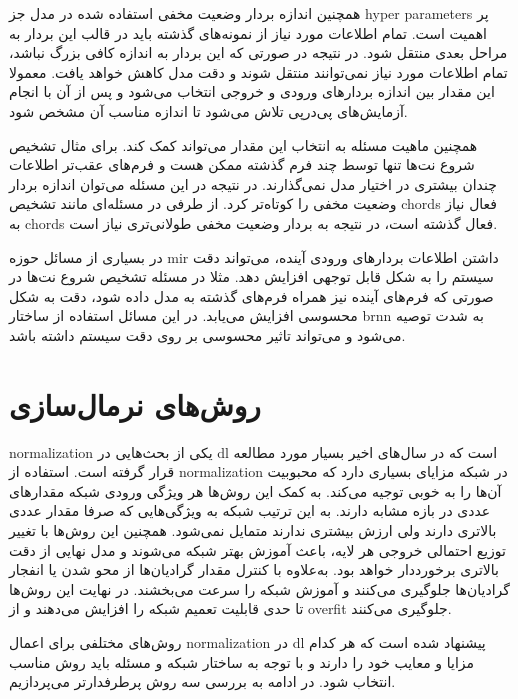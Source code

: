 همچنین اندازه بردار وضعیت مخفی استفاده شده در مدل جز \glspl{hyper parameter} پر
اهمیت است. تمام اطلاعات مورد نیاز از نمونه‌های گذشته باید در قالب این بردار
به مراحل بعدی منتقل شود. در نتیجه در صورتی که این بردار به اندازه کافی بزرگ
نباشد، تمام اطلاعات مورد نیاز نمی‌توانند منتقل شوند و دقت مدل کاهش خواهد یافت.
معمولا این مقدار بین اندازه بردارهای ورودی و خروجی انتخاب می‌شود و پس از آن با
انجام آزمایش‌های پی‌در‌پی تلاش می‌شود تا اندازه مناسب آن مشخص شود.

همچنین ماهیت مسئله به انتخاب این مقدار می‌تواند کمک کند. برای مثال تشخیص شروع
نت‌ها تنها توسط چند فرم گذشته ممکن هست و فرم‌های عقب‌تر اطلاعات چندان بیشتری در
اختیار مدل نمی‌گذارند. در نتیجه در این مسئله می‌توان اندازه بردار وضعیت مخفی را
کوتاه‌تر کرد. از طرفی در مسئله‌ای مانند تشخیص \glspl{chord} فعال نیاز به
\glspl{chord} فعال گذشته است، در نتیجه به بردار وضعیت مخفی طولانی‌تری نیاز است.

در بسیاری از مسائل حوزه \gls{mir} داشتن اطلاعات بردارهای ورودی آینده، می‌تواند
دقت سیستم را به شکل قابل توجهی افزایش دهد. مثلا در مسئله تشخیص شروع نت‌ها در
صورتی که فرم‌های آینده نیز همراه فرم‌های گذشته به مدل داده شود، دقت به شکل
محسوسی افزایش می‌یابد. در این مسائل استفاده از ساختار \gls{brnn} به شدت توصیه
می‌شود و می‌تواند تاثیر محسوسی بر روی دقت سیستم داشته باشد.

\section{روش‌های نرمال‌سازی}
\gls{normalization} یکی از بحث‌هایی در \gls{dl} است که در سال‌های اخیر بسیار
مورد مطالعه قرار گرفته است. استفاده از \gls{normalization} در شبکه مزایای بسیاری
دارد که محبوبیت آن‌ها را به خوبی توجیه می‌کند. به کمک این روش‌ها هر ویژگی ورودی
شبکه مقدارهای عددی در بازه مشابه دارند. به این ترتیب شبکه به ویژگی‌هایی که صرفا
مقدار عددی بالاتری دارند ولی ارزش بیشتری ندارند متمایل نمی‌شود. همچنین این
روش‌ها با تغییر توزیع احتمالی خروجی هر لایه، باعث آموزش بهتر شبکه می‌شوند و مدل
نهایی از دقت بالاتری برخورددار خواهد بود. به‌علاوه با کنترل مقدار گرادیان‌ها از
محو شدن یا انفجار گرادیان‌ها جلوگیری می‌کنند و آموزش شبکه را سرعت می‌بخشند. در
نهایت این روش‌ها تا حدی قابلیت تعمیم شبکه را افزایش می‌دهند و از \gls{overfit}
جلوگیری می‌کنند.

روش‌های مختلفی برای اعمال \gls{normalization} در \gls{dl} پیشنهاد شده است که هر
کدام مزایا و معایب خود را دارند و با توجه به ساختار شبکه و مسئله باید روش مناسب
انتخاب شود. در ادامه به بررسی سه روش پرطرفدارتر می‌پردازیم.

